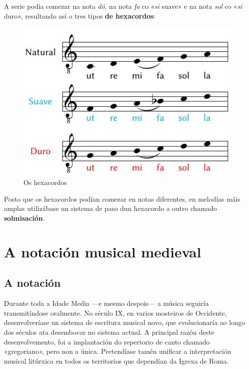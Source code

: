 \documentclass[a4paper, twoside]{templates/ociamthesis}
\begin{document}
A serie podía comezar na nota \emph{dó}, na nota \emph{fa} co «\emph{si} suave» e na nota \emph{sol} co «\emph{si} duro», resultando así o tres tipos \textbf{de hexacordos}:

\begin{figure}
\centering
\includegraphics{figures/ud-03/hexacordos.jpg}
\caption{Os hexacordos}
\end{figure}

Posto que os hexacordos podían comezar en notas diferentes, en melodías máis amplas utilizábase un sistema de paso dun hexacordo a outro chamado \textbf{solmisación}.

\hypertarget{a-notaciuxf3n-musical-medieval}{%
\section*{A notación musical medieval}\label{a-notaciuxf3n-musical-medieval}}

\hypertarget{a-notaciuxf3n}{%
\subsection{A notación}\label{a-notaciuxf3n}}

Durante toda a Idade Media ---e mesmo despois--- a música seguiría transmitíndose oralmente. No século IX, en varios mosteiros de Occidente, desenvolveríase un sistema de escritura musical novo, que evolucionaría ao longo dos séculos ata desembocar no sistema actual. A principal razón deste desenvolvemento, foi a implantación do repertorio de canto chamado «gregoriano», pero non a única. Pretendíase tamén unificar a interpretación musical litúrxica en todos os territorios que dependían da Igrexa de Roma.
\end{document}
